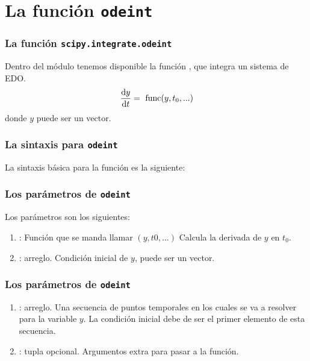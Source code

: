 \documentclass[12pt]{beamer}
\begin{document}
\section{La función \texttt{odeint}}
\begin{frame}
\frametitle{La función \texttt{scipy.integrate.odeint}}
Dentro del módulo  tenemos disponible la función , que integra un sistema de EDO.
\pause
\begin{align*}
\dv{y}{t} = \mbox{ func}(y, t_{0}, ...)
\end{align*}
donde $y$ puede ser un vector.
\end{frame}
\begin{frame}[fragile]
\frametitle{La sintaxis para \texttt{odeint}}
La sintaxis básica para la función es la siguiente:
\\
\bigskip
\pause
{}
\end{frame}
\begin{frame}
\frametitle{Los parámetros de \texttt{odeint}}
Los parámetros son los siguientes:
\begin{enumerate}[<+->]
\item {} : Función que se manda llamar $(y, t0, ...)$ Calcula la derivada de $y$ en $t_{0}$.
\item {} : arreglo. Condición inicial de $y$, puede ser un vector.
\seti
\end{enumerate}
\end{frame}
\begin{frame}
\frametitle{Los parámetros de \texttt{odeint}}
\begin{enumerate}[<+->]
\conti
\item {} : arreglo. Una secuencia de puntos temporales en los cuales se va a resolver para la variable $y$. La condición inicial debe de ser el primer elemento de esta secuencia.
\item {} : tupla opcional. Argumentos extra para pasar a la función.
\end{enumerate}
\end{frame}
\end{document}
